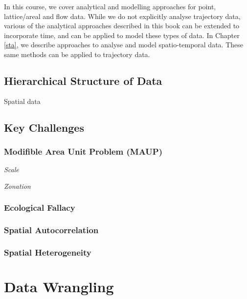 \documentclass[
]{book}
\begin{document}
In this course, we cover analytical and modelling approaches for point, lattice/areal and flow data. While we do not explicitly analyse trajectory data, various of the analytical approaches described in this book can be extended to incorporate time, and can be applied to model these types of data. In Chapter \ref{sta}, we describe approaches to analyse and model spatio-temporal data. These same methods can be applied to trajectory data.

\hypertarget{hierarchical-structure-of-data}{%
\section{Hierarchical Structure of Data}\label{hierarchical-structure-of-data}}

Spatial data

\hypertarget{key-challenges}{%
\section{Key Challenges}\label{key-challenges}}

\hypertarget{modifible-area-unit-problem-maup}{%
\subsection{Modifible Area Unit Problem (MAUP)}\label{modifible-area-unit-problem-maup}}

\emph{Scale}

\emph{Zonation}

\hypertarget{ecological-fallacy}{%
\subsection{Ecological Fallacy}\label{ecological-fallacy}}

\hypertarget{spatial-autocorrelation}{%
\subsection{Spatial Autocorrelation}\label{spatial-autocorrelation}}

\hypertarget{spatial-heterogeneity}{%
\subsection{Spatial Heterogeneity}\label{spatial-heterogeneity}}

\hypertarget{data_wrangling}{%
\chapter{Data Wrangling}\label{data_wrangling}}
\end{document}
